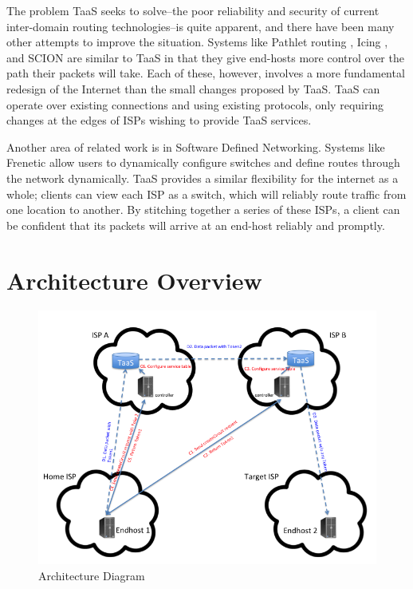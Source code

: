 \documentclass{article}
\begin{document}
The problem TaaS seeks to solve--the poor reliability and security of
current inter-domain routing technologies--is quite apparent, and
there have been many other attempts to improve the situation. Systems
like Pathlet routing \cite{pathlet}, Icing \cite{icing}, and SCION
\cite{scion} are similar to TaaS in that they give end-hosts more
control over the path their packets will take. Each of these, however,
involves a more fundamental redesign of the Internet than the small
changes proposed by TaaS. TaaS can operate over existing connections
and using existing protocols, only requiring changes at the edges of
ISPs wishing to provide TaaS services.

Another area of related work is in Software Defined
Networking. Systems like Frenetic \cite{frenetic} allow users to
dynamically configure switches and define routes through the network
dynamically. TaaS provides a similar flexibility for the internet as a
whole; clients can view each ISP as a switch, which will reliably
route traffic from one location to another. By stitching together a
series of these ISPs, a client can be confident that its packets will
arrive at an end-host reliably and promptly.

\section{Architecture Overview}
\begin{figure}
\includegraphics[width=\linewidth]{diagram}
\caption{Architecture Diagram}
\label{fig:diagram}
\end{figure}
\end{document}
